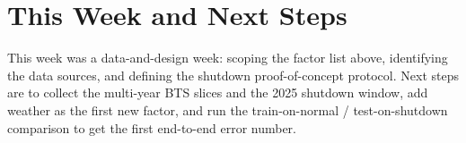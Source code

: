 \documentclass[11pt]{article}
\begin{document}
\section{This Week and Next Steps}
This week was a data-and-design week: scoping the factor list above, identifying
the data sources, and defining the shutdown proof-of-concept protocol. Next steps
are to collect the multi-year BTS slices and the 2025 shutdown window, add weather
as the first new factor, and run the train-on-normal / test-on-shutdown
comparison to get the first end-to-end error number.
\end{document}
